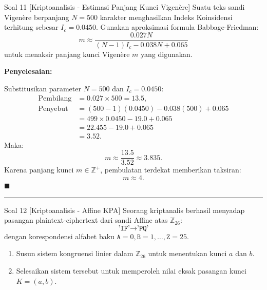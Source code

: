 \documentclass[11pt,a4paper]{article}
\newenvironment{solusi}{\noindent\textbf{\textsf{Penyelesaian:}}\par\vspace{0.2em}}{\hfill$\blacksquare$\vspace{1em}\par\hrule\vspace{1em}}
\begin{document}
\begin{soalanalisis}{Soal 11 [Kriptoanalisis - Estimasi Panjang Kunci Vigenère]}
Suatu teks sandi Vigenère berpanjang $N = 500$ karakter menghasilkan Indeks Koinsidensi terhitung sebesar $I_c = 0.0450$.
Gunakan aproksimasi formula Babbage-Friedman:
\[
m \approx \frac{0.027 N}{(N - 1)I_c - 0.038 N + 0.065}
\]
untuk menaksir panjang kunci Vigenère $m$ yang digunakan.
\end{soalanalisis}

\begin{solusi}
Substitusikan parameter $N = 500$ dan $I_c = 0.0450$:
\begin{align*}
\text{Pembilang} &= 0.027 \times 500 = 13.5, \\
\text{Penyebut} &= (500 - 1)(0.0450) - 0.038(500) + 0.065 \\
&= 499 \times 0.0450 - 19.0 + 0.065 \\
&= 22.455 - 19.0 + 0.065 \\
&= 3.52.
\end{align*}
Maka:
\[
m \approx \frac{13.5}{3.52} \approx 3.835.
\]
Karena panjang kunci $m \in \mathbb{Z}^+$, pembulatan terdekat memberikan taksiran:
\[
m \approx 4.
\]
\end{solusi}

\begin{soalanalisis}{Soal 12 [Kriptoanalisis - Affine KPA]}
Seorang kriptanalis berhasil menyadap pasangan plaintext-ciphertext dari sandi Affine atas $\mathbb{Z}_{26}$:
\[
\texttt{'IF'} \longrightarrow \texttt{'PQ'}
\]
dengan korespondensi alfabet baku $\texttt{A}=0, \texttt{B}=1, \dots, \texttt{Z}=25$.
\begin{enumerate}[label=(\alph*)]
    \item Susun sistem kongruensi linier dalam $\mathbb{Z}_{26}$ untuk menentukan kunci $a$ dan $b$.
    \item Selesaikan sistem tersebut untuk memperoleh nilai eksak pasangan kunci $K = (a, b)$.
\end{enumerate}
\end{soalanalisis}
\end{document}
